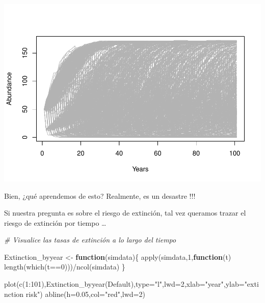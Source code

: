 \documentclass[
]{article}
\newenvironment{Shaded}{\begin{snugshade}}{\end{snugshade}}
\newcommand{\AttributeTok}[1]{\textcolor[rgb]{0.77,0.63,0.00}{#1}}
\newcommand{\CommentTok}[1]{\textcolor[rgb]{0.56,0.35,0.01}{\textit{#1}}}
\newcommand{\ControlFlowTok}[1]{\textcolor[rgb]{0.13,0.29,0.53}{\textbf{#1}}}
\newcommand{\DecValTok}[1]{\textcolor[rgb]{0.00,0.00,0.81}{#1}}
\newcommand{\FloatTok}[1]{\textcolor[rgb]{0.00,0.00,0.81}{#1}}
\newcommand{\FunctionTok}[1]{\textcolor[rgb]{0.00,0.00,0.00}{#1}}
\newcommand{\NormalTok}[1]{#1}
\newcommand{\OtherTok}[1]{\textcolor[rgb]{0.56,0.35,0.01}{#1}}
\newcommand{\SpecialCharTok}[1]{\textcolor[rgb]{0.00,0.00,0.00}{#1}}
\newcommand{\StringTok}[1]{\textcolor[rgb]{0.31,0.60,0.02}{#1}}
\begin{document}
\includegraphics{LECTURE12_files/figure-latex/unnamed-chunk-5-1.pdf}

Bien, ¿qué aprendemos de esto? Realmente, es un desastre !!!

Si nuestra pregunta es sobre el riesgo de extinción, tal vez queramos
trazar el riesgo de extinción por tiempo \ldots{}

\begin{Shaded}
\begin{Highlighting}[]
\CommentTok{\# Visualice las tasas de extinción a lo largo del tiempo}

\NormalTok{Extinction\_byyear }\OtherTok{\textless{}{-}} \ControlFlowTok{function}\NormalTok{(simdata)\{}
  \FunctionTok{apply}\NormalTok{(simdata,}\DecValTok{1}\NormalTok{,}\ControlFlowTok{function}\NormalTok{(t)  }\FunctionTok{length}\NormalTok{(}\FunctionTok{which}\NormalTok{(t}\SpecialCharTok{==}\DecValTok{0}\NormalTok{)))}\SpecialCharTok{/}\FunctionTok{ncol}\NormalTok{(simdata)}
\NormalTok{\}}

\FunctionTok{plot}\NormalTok{(}\FunctionTok{c}\NormalTok{(}\DecValTok{1}\SpecialCharTok{:}\DecValTok{101}\NormalTok{),}\FunctionTok{Extinction\_byyear}\NormalTok{(Default),}\AttributeTok{type=}\StringTok{"l"}\NormalTok{,}\AttributeTok{lwd=}\DecValTok{2}\NormalTok{,}\AttributeTok{xlab=}\StringTok{"year"}\NormalTok{,}\AttributeTok{ylab=}\StringTok{"extinction risk"}\NormalTok{)}
\FunctionTok{abline}\NormalTok{(}\AttributeTok{h=}\FloatTok{0.05}\NormalTok{,}\AttributeTok{col=}\StringTok{"red"}\NormalTok{,}\AttributeTok{lwd=}\DecValTok{2}\NormalTok{)}
\end{Highlighting}
\end{Shaded}
\end{document}
